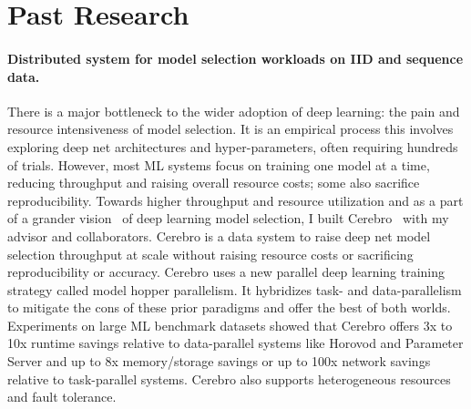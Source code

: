 \documentclass[letterpaper]{article}
\begin{document}
\section*{Past Research}


\paragraph{Distributed system for model selection workloads on IID and sequence data.} There is a major bottleneck to the wider adoption of deep learning: the pain and resource intensiveness of model selection. It is an empirical process this involves exploring deep net architectures and hyper-parameters, often requiring hundreds of trials. However, most ML systems focus on training one model at a time, reducing throughput and raising overall resource costs; some also sacrifice reproducibility. Towards higher throughput and resource utilization and as a part of a grander vision~\cite{cerebrocidr, kdd} of deep learning model selection, I built Cerebro~\cite{cerebro} with my advisor and collaborators. Cerebro is a data system to raise deep net model selection throughput at scale without raising resource costs or sacrificing reproducibility or accuracy. Cerebro uses a new parallel deep learning training strategy called model hopper parallelism. It hybridizes task- and data-parallelism to mitigate the cons of these prior paradigms and offer the best of both worlds. Experiments on large ML benchmark datasets showed that Cerebro offers 3x to 10x runtime savings relative to data-parallel systems like Horovod and Parameter Server and up to 8x memory/storage savings or up to 100x network savings relative to task-parallel systems. Cerebro also supports heterogeneous resources and fault tolerance.
\end{document}
